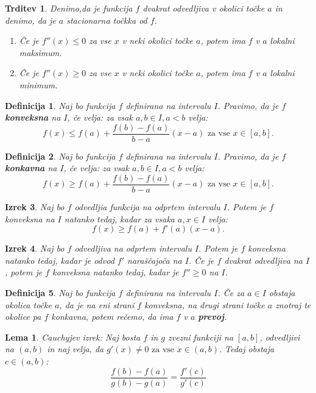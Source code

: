 \documentclass[a4paper,12pt]{report}
\newtheorem{izrek}{Izrek}[section]
\newtheorem{lema}{Lema}
\newtheorem{definicija}[izrek]{Definicija}
\newtheorem{trditev}{Trditev}
\begin{document}
\begin{trditev}
    Denimo,da je funkcija $f$ dvakrat odvedljiva v okolici točke $a$ in denimo, da je $a$ stacionarna točkka od $f$.
    \begin{enumerate}
        \item Če je $f''(x) \leq 0$ za vse $x$ v neki okolici točke $a$, potem ima $f$ v $a$ lokalni maksimum.
        \item Če je $f''(x) \geq 0$ za vse $x$ v neki okolici točke $a$, potem ima $f$ v $a$ lokalni minimum.
    \end{enumerate}
\end{trditev}

\begin{definicija}
    Naj bo funkcija $f$ definirana na intervalu $I$. Pravimo, da je $f$ \textbf{konveksna} na $I$, če velja: za vsak $a,b \in I, a < b$ velja: 
    $$f(x) \leq f(a) + \frac{f(b)-f(a)}{b-a} (x-a) \text{ za vse } x \in [a,b].$$
\end{definicija}

\begin{definicija}
    Naj bo funkcija $f$ definirana na intervalu $I$. Pravimo, da je $f$ \textbf{konkavna} na $I$, če velja: za vsak $a,b \in I, a < b$ velja: 
    $$f(x) \geq f(a) + \frac{f(b)-f(a)}{b-a} (x-a) \text{ za vse } x \in [a,b].$$
\end{definicija}

\begin{izrek}
    Naj bo $f$ odvedljia funkcija na odprtem intervalu $I$. Potem je $f$ konveksna na $I$ natanko tedaj, 
    kadar za vsaka $a,x \in I$ velja: $$f(x) \geq f(a) + f'(a)(x-a).$$
\end{izrek}

\begin{izrek}
    Naj bo $f$ odvedljiva na odprtem intervalu $I$. Potem je $f$ konveksna natanko tedaj, 
    kadar je odvod $f'$ naraščajoča na $I$. Če je $f$ dvakrat odvedljiva na $I$, potem je $f$ konveksna natanko tedaj, 
    kadar je $f'' \geq 0$ na $I$.
\end{izrek}

\begin{definicija}
    Naj bo funkcija $f$ definirana na intervalu $I$. Če za $a \in I$ obstaja okolica točke $a$, da je na eni strani $f$ 
    konveksna, na drugi strani točke $a$ znotraj te okolice pa $f$ konkavna, potem rečemo, da ima $f$ v $a$ \textbf{prevoj}. 
\end{definicija}

\begin{lema}
    Cauchyjev izrek: Naj bosta $f$ in $g$ zvezni funkciji na $[a,b]$, odvedljivi na $(a,b)$ in naj velja, da  
    $g'(x) \neq 0 \text{ za vse } x \in (a,b)$. Tedaj obstaja $c \in  (a,b)$: $$\frac{f(b)-f(a)}{g(b)-g(a)} = \frac{f'(c)}{g'(c)}$$
\end{lema}
\end{document}
